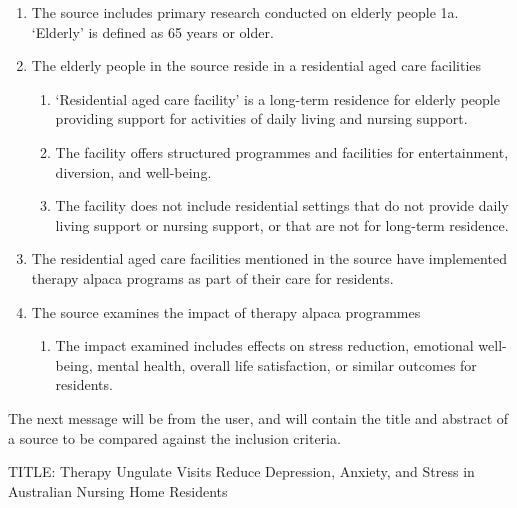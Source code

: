 \documentclass{article}
\begin{document}
\begin{description}
  \GPT \begin{enumerate}[label=\arabic*.\ ]
    \item The source includes primary research conducted on elderly people 1a.
    `Elderly' is defined as 65 years or older. 
    \item The elderly people in the source reside in a residential aged care
    facilities 
      \begin{enumerate}[label=\arabic{enumi}\alph*.\ ]
        \item `Residential aged care facility' is a long-term residence for
        elderly people providing support for activities of daily living and
        nursing support. 
        \item The facility offers structured programmes and facilities for
        entertainment, diversion, and well-being. 
        \item The facility does not include residential settings that do not
        provide daily living support or nursing support, or that are not for
        long-term residence. 
      \end{enumerate}
    \item The residential aged care facilities mentioned in the source have
    implemented therapy alpaca programs as part of their care for residents. 
    \item The source examines the impact of therapy alpaca programmes 
      \begin{enumerate}[label=\arabic{enumi}\alph*.\ ]
        \item The impact examined includes effects on stress reduction,
        emotional well-being, mental health, overall life satisfaction, or
        similar outcomes for residents.
      \end{enumerate}
    \end{enumerate}

  \System The next message will be from the user, and will contain the title
  and abstract of a source to be compared against the inclusion criteria.

  \User TITLE: Therapy Ungulate Visits Reduce Depression, Anxiety, and Stress
  in Australian Nursing Home Residents


\end{description}
\end{document}

